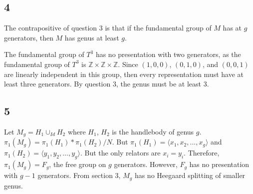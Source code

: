 \documentclass{article}
\theoremstyle{definition}
\numberwithin{theorem}{section}
\numberwithin{equation}{section}
\begin{document}
\subsection{4}
The contrapositive of question $3$ is that if the fundamental group of $M$ has at $g$ generators, then $M$ has genus at least $g$. 

The fundamental group of $T^3$ has no presentation with two generators, as the fundamental group of $T^3$ is $\mathbb{Z} \times \mathbb{Z} \times \mathbb{Z}$. Since $(1, 0, 0)$, $(0, 1, 0)$, and $(0,0, 1)$ are linearly independent in this group, then every representation must have at least three generators. By question 3, the genus must be at least 3. 

\subsection{5}
Let $M_g = H_1 \cup_{Id} H_2$ where $H_1$, $H_2$ is the handlebody of genus $g$. $\pi_1(M_g) = \pi_1(H_1) * \pi_1(H_2)/N$. But $\pi_1(H_1) = \langle x_1, x_2, ..., x_g \rangle$ and $\pi_1(H_2) = \langle y_1, y_2, ..., y_g \rangle$. But the only relators are $x_i = y_i$. Therefore, $\pi_1(M_g) = F_g$, the free group on $g$ generators. However, $F_g$ has no presentation with $g-1$ generators. From section 3, $M_g$ has no Heegaard splitting of smaller genus. 
\end{document}

